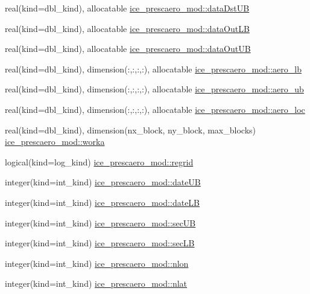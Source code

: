 \begin{DoxyCompactItemize}
\item 
real(kind=dbl\_\-kind), allocatable \hyperlink{namespaceice__prescaero__mod_aaafab7a06140832287cfb2357f553967}{ice\_\-prescaero\_\-mod::dataDstUB}
\item 
real(kind=dbl\_\-kind), allocatable \hyperlink{namespaceice__prescaero__mod_ab068cb9460ac0d6936bf8b6ffc60d694}{ice\_\-prescaero\_\-mod::dataOutLB}
\item 
real(kind=dbl\_\-kind), allocatable \hyperlink{namespaceice__prescaero__mod_ad753676afac58f6bdbb0c4ad5f330c09}{ice\_\-prescaero\_\-mod::dataOutUB}
\item 
real(kind=dbl\_\-kind), dimension(:,:,:,:), allocatable \hyperlink{namespaceice__prescaero__mod_acd22778b78cac460f018ccef7ec19441}{ice\_\-prescaero\_\-mod::aero\_\-lb}
\item 
real(kind=dbl\_\-kind), dimension(:,:,:,:), allocatable \hyperlink{namespaceice__prescaero__mod_a5da19bde8a1695cce4a672195097610a}{ice\_\-prescaero\_\-mod::aero\_\-ub}
\item 
real(kind=dbl\_\-kind), dimension(:,:,:,:), allocatable \hyperlink{namespaceice__prescaero__mod_a0bde5e1bf6589d6060071642738d53be}{ice\_\-prescaero\_\-mod::aero\_\-loc}
\item 
real(kind=dbl\_\-kind), dimension(nx\_\-block, ny\_\-block, max\_\-blocks) \hyperlink{namespaceice__prescaero__mod_a425d07f2285f906fd3d7feb2590c6381}{ice\_\-prescaero\_\-mod::worka}
\item 
logical(kind=log\_\-kind) \hyperlink{namespaceice__prescaero__mod_af47c8a64b468928d1aaad008ef8609d8}{ice\_\-prescaero\_\-mod::regrid}
\item 
integer(kind=int\_\-kind) \hyperlink{namespaceice__prescaero__mod_a30a561e9f5e6d98c4f0ea75abe09c691}{ice\_\-prescaero\_\-mod::dateUB}
\item 
integer(kind=int\_\-kind) \hyperlink{namespaceice__prescaero__mod_a6be4e65c946ef5d7a771830e380b7a98}{ice\_\-prescaero\_\-mod::dateLB}
\item 
integer(kind=int\_\-kind) \hyperlink{namespaceice__prescaero__mod_a635da64637bdade19196f7e407c86f3b}{ice\_\-prescaero\_\-mod::secUB}
\item 
integer(kind=int\_\-kind) \hyperlink{namespaceice__prescaero__mod_a93fbf6de60396f73513b16a2d0230a0b}{ice\_\-prescaero\_\-mod::secLB}
\item 
integer(kind=int\_\-kind) \hyperlink{namespaceice__prescaero__mod_a06c7ca3e93cd15535e2ed6f3cd5bf314}{ice\_\-prescaero\_\-mod::nlon}
\item 
integer(kind=int\_\-kind) \hyperlink{namespaceice__prescaero__mod_a7b9a21f0e090fc79f73045a9e324d08f}{ice\_\-prescaero\_\-mod::nlat}

\end{DoxyCompactItemize}
